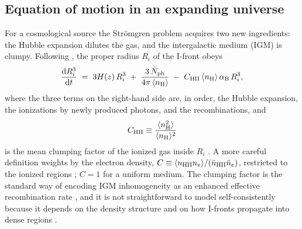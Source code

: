 \documentclass[11pt,a4paper]{article}
\newcommand{\aB}{\alpha_{\rm B}}
\newcommand{\nH}{n_{\rm H}}
\begin{document}
\subsection{Equation of motion in an expanding universe}
For a cosmological source the Str\"omgren problem acquires two new ingredients: the Hubble expansion
dilutes the gas, and the intergalactic medium (IGM) is clumpy. Following
\citet{ShapiroGiroux1987}, the proper radius $R_i$ of the I-front obeys \citep[eq.~3]{Cen2000}
\begin{equation}
  \frac{{\rm d}R_i^3}{{\rm d}t}
  \;=\; 3H(z)\,R_i^3
  \;+\; \frac{3\,\dot N_{\rm ph}}{4\pi\,\langle \nH\rangle}
  \;-\; C_{\rm HII}\,\langle \nH\rangle\,\aB\,R_i^3,
  \label{eq:cosmo_ode}
\end{equation}
where the three terms on the right-hand side are, in order, the Hubble expansion, the ionizations by
newly produced photons, and the recombinations, and
\begin{equation}
  C_{\rm HII}\equiv\frac{\langle n_{\rm H}^2\rangle}{\langle \nH\rangle^2}
\end{equation}
is the mean clumping factor of the ionized gas inside $R_i$ \citep{Cen2000}. A more careful
definition weights by the electron density,
$C\equiv\langle n_{\rm HII}n_e\rangle/(\bar n_{\rm HII}\bar n_e)$, restricted to the ionized regions
\citep[eq.~64]{Choudhury2022}; $C=1$ for a uniform medium. The clumping factor is the standard way of
encoding IGM inhomogeneity as an enhanced effective recombination rate
\citep{MiraldaEscude2000,Choudhury2022}, and it is not straightforward to model self-consistently
because it depends on the density structure and on how I-fronts propagate into dense regions
\citep{Choudhury2022}.
\end{document}
